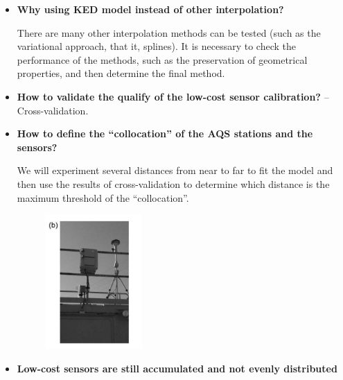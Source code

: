\documentclass{article}
\begin{document}
\begin{itemize}
    \item \textbf{Why using KED model instead of other interpolation?} {
    
    There are many other interpolation methods can be tested (such as the variational approach, that it, splines). It is necessary to check the performance of the methods, such as the preservation of geometrical properties, and then determine the final method.
    }
    \item \textbf{How to validate the qualify of the low-cost sensor calibration?} -- Cross-validation.
    \item \textbf{How to define the ``collocation'' of the AQS stations and the sensors?} {
    
    We will experiment several distances from near to far to fit the model and then use the results of cross-validation to determine which distance is the maximum threshold of the ``collocation''.
    \begin{figure}[H]
        \centering
        \includegraphics[width=0.35\textwidth]{img/collocation.png}
        \label{fig:col}
    \end{figure}
    }
    \item \textbf{Low-cost sensors are still accumulated and not evenly distributed} {
    
}
\end{itemize}
\end{document}
